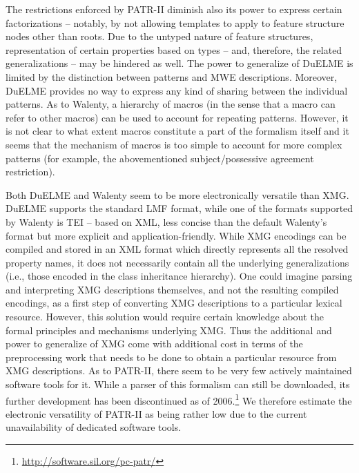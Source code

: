 \documentclass[output=paper
,modfonts
,nonflat
,biblatexbackend=biber
]{langsci/langscibook}
\begin{document}
The restrictions enforced by PATR-II diminish also its power to express certain factorizations -- notably, by not allowing templates to apply to feature structure nodes other than roots. Due to the untyped nature of feature structures, representation of certain properties based on types -- and, therefore, the related generalizations -- may be hindered as well. The power to generalize of DuELME is limited by the distinction between patterns and MWE descriptions. Moreover, DuELME provides no way to express any kind of sharing between the individual patterns. As to Walenty, a hierarchy of macros (in the sense that a macro can refer to other macros) can be used to account for repeating patterns. However, it is not clear to what extent macros constitute a part of the formalism itself and it seems that the mechanism of macros is too simple to account for more complex patterns (for example, the abovementioned subject/possessive agreement restriction).
 
Both DuELME and Walenty seem to be more electronically versatile than XMG. DuELME supports the standard LMF format, while one of the formats supported by Walenty is TEI -- based on XML, less concise than the default Walenty's format but more explicit and application-friendly. While XMG encodings can be compiled and stored in an XML format which directly represents all the resolved property names, it does not necessarily contain all the underlying generalizations (i.e., those encoded in the class inheritance hierarchy). One could imagine parsing and interpreting XMG descriptions themselves, and not the resulting compiled encodings, as a first step of converting XMG descriptions to a particular lexical resource. However, this solution would require certain knowledge about the formal principles and mechanisms underlying XMG. Thus the additional  and power to generalize of XMG come with additional cost in terms of the preprocessing work that needs to be done to obtain a particular resource from XMG descriptions. As to PATR-II, there seem to be very few actively maintained software tools for it. While a parser of this formalism can still be downloaded, its further development has been discontinued as of 2006.\footnote{\url{http://software.sil.org/pc-patr/}} We therefore estimate the electronic versatility of PATR-II as being rather low due to the current unavailability of dedicated software tools. 
\end{document}
